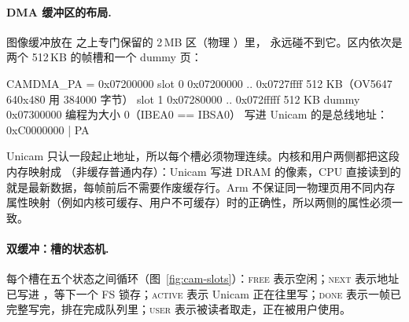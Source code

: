\paragraph{DMA 缓冲区的布局.} 图像缓冲放在  之上专门保留的 2\,MB  区（物理 ）里， 永远碰不到它。区内依次是两个 512\,KB 的帧槽和一个 dummy 页：

\begin{txtcode}
CAMDMA_PA = 0x07200000
  slot 0  0x07200000 .. 0x0727ffff   512 KB（OV5647 640x480 用 384000 字节）
  slot 1  0x07280000 .. 0x072fffff   512 KB
  dummy   0x07300000                 编程为大小 0（IBEA0 == IBSA0）
写进 Unicam 的是总线地址：0xC0000000 | PA
\end{txtcode}

Unicam 只认一段起止地址，所以每个槽必须物理连续。内核和用户两侧都把这段内存映射成 （非缓存普通内存）：Unicam 写进 DRAM 的像素，CPU 直接读到的就是最新数据，每帧前后不需要作废缓存行。Arm 不保证同一物理页用不同内存属性映射（例如内核可缓存、用户不可缓存）时的正确性，所以两侧的属性必须一致。

\paragraph{双缓冲：槽的状态机.} 每个槽在五个状态之间循环（图~\ref{fig:cam-slots}）：\textsc{free} 表示空闲；\textsc{next} 表示地址已写进 ，等下一个 FS 锁存；\textsc{active} 表示 Unicam 正在往里写；\textsc{done} 表示一帧已完整写完，排在完成队列里；\textsc{user} 表示被读者取走，正在被用户使用。

